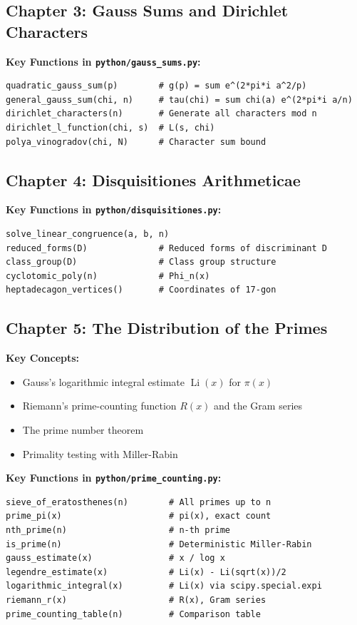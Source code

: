 \documentclass[11pt,a4paper]{article}
\begin{document}
\subsection{Chapter 3: Gauss Sums and Dirichlet Characters}

\textbf{Key Functions in \texttt{python/gauss\_sums.py}:}
\begin{lstlisting}[style=python]
quadratic_gauss_sum(p)        # g(p) = sum e^(2*pi*i a^2/p)
general_gauss_sum(chi, n)     # tau(chi) = sum chi(a) e^(2*pi*i a/n)
dirichlet_characters(n)       # Generate all characters mod n
dirichlet_l_function(chi, s)  # L(s, chi)
polya_vinogradov(chi, N)      # Character sum bound
\end{lstlisting}

\subsection{Chapter 4: Disquisitiones Arithmeticae}

\textbf{Key Functions in \texttt{python/disquisitiones.py}:}
\begin{lstlisting}[style=python]
solve_linear_congruence(a, b, n)
reduced_forms(D)              # Reduced forms of discriminant D
class_group(D)                # Class group structure
cyclotomic_poly(n)            # Phi_n(x)
heptadecagon_vertices()       # Coordinates of 17-gon
\end{lstlisting}

\subsection{Chapter 5: The Distribution of the Primes}

\textbf{Key Concepts:}
\begin{itemize}
    \item Gauss's logarithmic integral estimate $\operatorname{Li}(x)$ for $\pi(x)$
    \item Riemann's prime-counting function $R(x)$ and the Gram series
    \item The prime number theorem
    \item Primality testing with Miller-Rabin
\end{itemize}

\textbf{Key Functions in \texttt{python/prime\_counting.py}:}
\begin{lstlisting}[style=python]
sieve_of_eratosthenes(n)        # All primes up to n
prime_pi(x)                     # pi(x), exact count
nth_prime(n)                    # n-th prime
is_prime(n)                     # Deterministic Miller-Rabin
gauss_estimate(x)               # x / log x
legendre_estimate(x)            # Li(x) - Li(sqrt(x))/2
logarithmic_integral(x)         # Li(x) via scipy.special.expi
riemann_r(x)                    # R(x), Gram series
prime_counting_table(n)         # Comparison table
\end{lstlisting}
\end{document}
